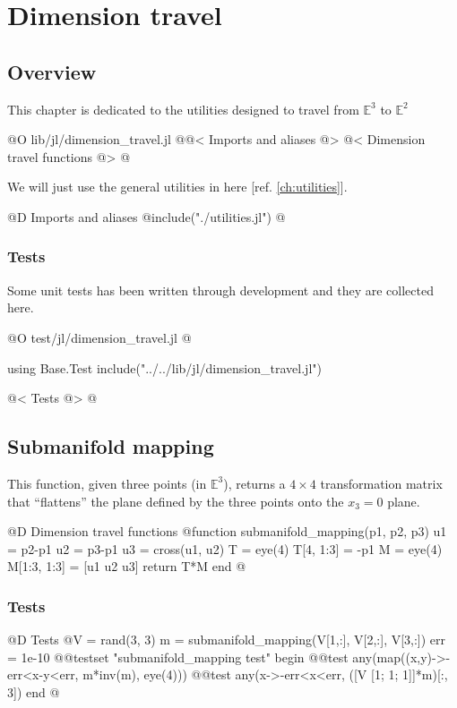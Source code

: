 
\chapter{Dimension travel}
\label{ch:dimension_travel}

\section{Overview}

This chapter is dedicated to
the utilities designed to travel
from $\mathbb{E}^3$ to $\mathbb{E}^2$

@O lib/jl/dimension_travel.jl
@{@< Imports and aliases @>
@< Dimension travel functions @>
@}

We will just use the general utilities
in here [ref. \ref{ch:utilities}].

@D Imports and aliases
@{include("./utilities.jl")
@}
\subsection{Tests}

Some unit tests has been written through development and
they are collected here.

@O test/jl/dimension_travel.jl
@{using Base.Test
include("../../lib/jl/dimension_travel.jl")

@< Tests @>
@}


\section{Submanifold mapping}
\label{sec:submanifold_mapping}

This function, given three points (in $\mathbb{E}^3$), 
returns a $4\times4$ transformation matrix that ``flattens''
the plane defined by the three points onto the $x_3=0$ plane.

@D Dimension travel functions
@{function submanifold_mapping(p1, p2, p3)
    u1 = p2-p1
    u2 = p3-p1
    u3 = cross(u1, u2)
    T = eye(4)
    T[4, 1:3] = -p1
    M = eye(4)
    M[1:3, 1:3] = [u1 u2 u3]
    return T*M
end
@}
\subsection{Tests}

@D Tests
@{V = rand(3, 3)
m = submanifold_mapping(V[1,:], V[2,:], V[3,:])
err = 1e-10 
@@testset "submanifold_mapping test" begin
    @@test any(map((x,y)->-err<x-y<err, m*inv(m), eye(4)))
    @@test any(x->-err<x<err, ([V [1; 1; 1]]*m)[:, 3])
end
@}





